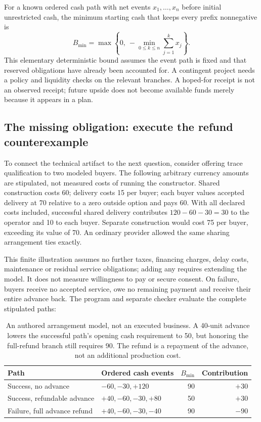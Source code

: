 For a known ordered cash path with net events $x_1,\ldots,x_n$ before initial unrestricted cash, the minimum starting cash that keeps every prefix nonnegative is
\begin{equation}
B_{\min}=\max\left\{0,\ -\min_{0\leq k\leq n}\sum_{j=1}^{k}x_j\right\}.
\label{eq:cash}
\end{equation}
This elementary deterministic bound assumes the event path is fixed and that reserved obligations have already been accounted for. A contingent project needs a policy and liquidity checks on the relevant branches. A hoped-for receipt is not an observed receipt; future upside does not become available funds merely because it appears in a plan.

\subsection{The missing obligation: execute the refund counterexample}
To connect the technical artifact to the next question, consider offering trace qualification to two modeled buyers. The following arbitrary currency amounts are stipulated, not measured costs of running the constructor. Shared construction costs 60; delivery costs 15 per buyer; each buyer values accepted delivery at 70 relative to a zero outside option and pays 60. With all declared costs included, successful shared delivery contributes $120-60-30=30$ to the operator and 10 to each buyer. Separate construction would cost 75 per buyer, exceeding its value of 70. An ordinary provider allowed the same sharing arrangement ties exactly.

This finite illustration assumes no further taxes, financing charges, delay costs, maintenance or residual service obligations; adding any requires extending the model. It does not measure willingness to pay or secure consent. On failure, buyers receive no accepted service, owe no remaining payment and receive their entire advance back. The program and separate checker evaluate the complete stipulated paths:

\begin{table}[htbp]
\small
\begin{tabularx}{\textwidth}{YP{1.66in}rr}
\toprule
\textbf{Path} & \textbf{Ordered cash events} & \textbf{$B_{\min}$} & \textbf{Contribution}\\
\midrule
Success, no advance & $-60,-30,+120$ & 90 & $+30$\\
Success, refundable advance & $+40,-60,-30,+80$ & 50 & $+30$\\
Failure, full advance refund & $+40,-60,-30,-40$ & 90 & $-90$\\
\bottomrule
\end{tabularx}
\caption{An authored arrangement model, not an executed business. A 40-unit advance lowers the successful path's opening cash requirement to 50, but honoring the full-refund branch still requires 90. The refund is a repayment of the advance, not an additional production cost.}
\label{tab:refund}
\end{table}

